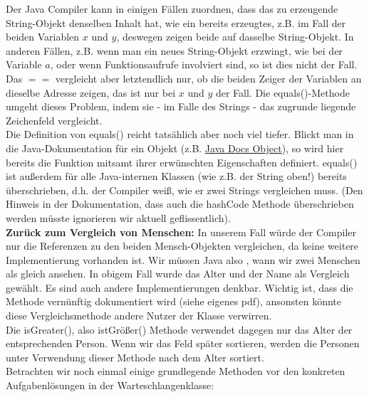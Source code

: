 \documentclass{article}
\begin{document}
Der Java Compiler kann in einigen Fällen zuordnen, dass das zu erzeugende String-Objekt denselben Inhalt hat, wie ein bereits erzeugtes, z.B. im Fall der beiden Variablen $x$ und $y$, deswegen zeigen beide auf dasselbe String-Objekt. In anderen Fällen, z.B. wenn man ein neues String-Objekt erzwingt, wie bei der Variable $a$, oder wenn Funktionsaufrufe involviert sind, so ist dies nicht der Fall. Das $==$ vergleicht aber letztendlich nur, ob die beiden Zeiger der Variablen an dieselbe Adresse zeigen, das ist nur bei $x$ und $y$ der Fall. Die equals()-Methode umgeht dieses Problem, indem sie - im Falle des Strings - das zugrunde liegende Zeichenfeld vergleicht. \\
Die Definition von equals() reicht tatsählich aber noch viel tiefer. Blickt man in die Java-Dokumentation für ein Objekt (z.B. \href{https://docs.oracle.com/javase/7/docs/api/java/lang/Object.html}{Java Docs Object}), so wird hier bereits die Funktion mitsamt ihrer erwünschten Eigenschaften definiert. equals() ist außerdem für alle Java-internen Klassen (wie z.B. der String oben!) 
bereits überschrieben, d.h. der Compiler weiß, wie er zwei Strings vergleichen muss. (Den Hinweis in der Dokumentation, dass auch die hashCode Methode überschrieben werden müsste ignorieren wir aktuell geflissentlich).\\
\textbf{Zurück zum Vergleich von Menschen:}
In unserem Fall würde der Compiler nur die Referenzen zu den beiden Mensch-Objekten vergleichen, da keine weitere Implementierung vorhanden ist. Wir müssen Java also , wann wir zwei Menschen als gleich ansehen. In obigem Fall wurde das Alter und der Name als Vergleich gewählt. Es sind auch andere Implementierungen denkbar. Wichtig ist, dass die Methode vernünftig dokumentiert wird (siehe eigenes pdf), ansonsten könnte diese Vergleichsmethode andere Nutzer der Klasse verwirren. \\
Die isGreater(), also istGrößer() Methode verwendet dagegen nur das Alter der entsprechenden Person. Wenn wir das Feld später sortieren, werden die Personen unter Verwendung dieser Methode nach dem Alter sortiert. \\

Betrachten wir noch einmal einige grundlegende Methoden vor den konkreten Aufgabenlösungen in der Warteschlangenklasse:
\end{document}

